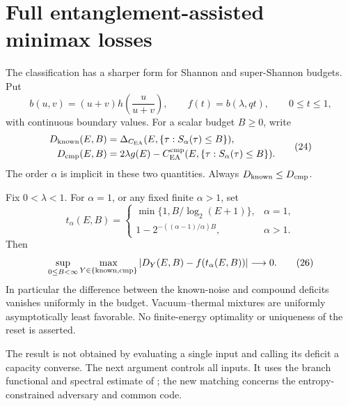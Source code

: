 \section{Full entanglement-assisted minimax losses}\label{sec:curves}
The classification has a sharper form for Shannon and super-Shannon
budgets. Put
\[
 b(u,v)=(u+v)h\!\left(\frac{u}{u+v}\right),\qquad
 f(t)=b(\lambda,qt),\qquad 0\le t\le1,
\]
with continuous boundary values. For a scalar budget \(B\ge0\), write
\[
 \begin{aligned}
 D_{\rm known}(E,B)&=\Delta_{C_{\mathrm{EA}}}(E,\{\tau:S_\alpha(\tau)\le B\}),\\
 D_{\mathrm{cmp}}(E,B)&=2\lambda g(E)-C_{\mathrm{EA}}^{\mathrm{cmp}}
                  (E,\{\tau:S_\alpha(\tau)\le B\}).
 \end{aligned}
                                                               \tag{24}
\]
The order \(\alpha\) is implicit in these two quantities.
Always \(D_{\rm known}\le D_{\mathrm{cmp}}\).

\begin{theorem}\label{thm:curves}
Fix \(0<\lambda<1\). For \(\alpha=1\), or any fixed finite
\(\alpha>1\), set
\[
 t_\alpha(E,B)=
 \begin{cases}
 \min\{1,B/\log_2(E+1)\},&\alpha=1,\\
 1-2^{-((\alpha-1)/\alpha)B},&\alpha>1.
 \end{cases}                                                   \tag{25}
\]
Then
\[
 \sup_{0\le B<\infty}\max_{Y\in\{{\rm known},\mathrm{cmp}\}}
 \left|D_Y(E,B)-f(t_\alpha(E,B))\right|\longrightarrow0.
                                                               \tag{26}
\]
In particular the difference between the known-noise and compound
deficits vanishes uniformly in the budget. Vacuum--thermal mixtures
are uniformly asymptotically least favorable. No finite-energy
optimality or uniqueness of the reset is asserted.
\end{theorem}

The result is not obtained by evaluating a single input and calling its
deficit a capacity converse. The next argument controls all inputs. It
uses the branch functional and spectral estimate of \cite{minimax}; the
new matching concerns the entropy-constrained adversary and common code.

